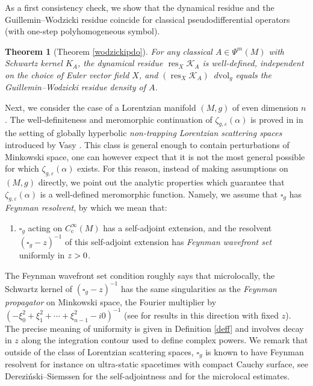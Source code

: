 \documentclass[10pt]{amsart}
\let\pazocal\mathscr
\newtheorem{theorem}{Theorem}[section]
\theoremstyle{definition}
\renewcommand\c{\mathrm{c}}
\let\cv\alpha
\let\Im\relax
\DeclareMathOperator{\Im}{Im}
\DeclareMathOperator*{\res}{res}
\newcommand\dvol{\mathop{}\!d\mathrm{vol}}
\begin{document}
As a first consistency check, we show that the dynamical residue and the Guillemin--Wodzicki residue coincide for classical pseudo\-differential operators (\ie with one-step polyhomogeneous symbol).

\begin{theorem}[{\cf Theorem \ref{wodzickipdo}}]\label{tthm1} For any classical $A\in \Psi^m(M)$ with Schwartz kernel $K_{A}$, the dynamical residue {$\res_X \pazocal{K}_{A}$} is well-defined, independent on the choice of Euler vector field $X$, and {$(\res_X \pazocal{K}_{A}) \dvol_g$} equals the Guillemin--Wodzicki residue density of $A$.
\end{theorem}

Next, we consider the case of a Lorentzian manifold $(M,g)$ of even dimension $n$.
The well-definiteness and meromorphic continuation of $\zeta_{g,\varepsilon}(\cv)$ is proved in \cite{Dang2020} in the setting of globally hyperbolic \emph{non-trapping Lorentzian scattering spaces} introduced by Vasy \cite{vasyessential}. This class is general enough to contain perturbations of Minkowski space, one can however expect that it is not the most general possible for which $\zeta_{g,\varepsilon}(\cv)$ exists. For this reason, instead of making assumptions on $(M,g)$ directly, we point out the analytic properties which guarantee that $\zeta_{g,\varepsilon}(\cv)$ is a well-defined meromorphic function. Namely, we assume that $\square_g$ has \emph{Feynman resolvent}, by which we mean that:
\begin{enumerate}
\item[] $\square_g$ acting on $C_\c^\infty(M)$ has a self-adjoint extension, and the resolvent $(\square_g-z)^{-1}$ of this self-adjoint extension has \emph{Feynman wavefront set} uniformly in $\Im z >0$.
\end{enumerate}

The Feynman wavefront set condition roughly says that microlocally, the Schwartz kernel of $(\square_g-z)^{-1}$ has the same singularities as the \emph{Feynman propagator} on Minkowski space, \ie the Fourier multiplier by $(-\xi_0^2 + \xi_1^2 + \cdots+ \xi_{n-1}^2 - i0)^{-1}$ (see \cite{GHV,Vasy2017b,vasywrochna,GWfeynman,Gerard2019b,Taira2020a} for results in this direction with fixed $z$).
The precise meaning of uniformity is given in Definition \ref{deff} and involves decay in $z$ along the integration contour used to define complex powers. We remark that outside of the class of Lorentzian scattering spaces, $\square_g$ is known to have Feynman resolvent for instance on ultra-static spacetimes with compact Cauchy surface, see Derezi\'nski--Siemssen \cite{derezinski} for the self-adjointness and \cite{Dang2020} for the microlocal estimates.
\end{document}
